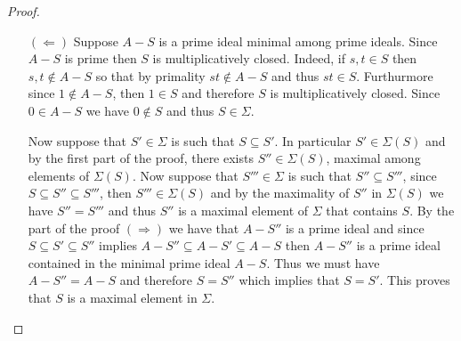 \begin{proof}
\begin{enumerate}
\begin{itemize}
	In order to prove \eqref{eq:not-in-S-nilradical}, first define the set $S_a\subseteq A$ as the product of the multiplicative sets $S$ and $\{1,a,a^2,\ldots\}$. Cleary $S_a$ is a multiplicative set. Since $1\in S$ by definition, we have that $a\in S_a$. Additionally, since $1\in\{1,a,a^2,\ldots\}$, then $S\subseteq S_a$. Therefore $a\not\in S$ if and only if $S\subsetneq S_a$. On the other hand, by definiton $a/1\in\mathrm{Nil}(S^{-1}A)$ if and only if $(a/1)^n=a^n/1=0/1$ for some $n>0$. This equality happens in $S^{-1}A$ if and only if there exists an $s\in S$ such that $a^ns=0$, but this is precisely the definition of $0$ being an element of $S_a$. With these considerations we have just reduced the problem of proving \eqref{eq:not-in-S-nilradical} to proving:
	\begin{equation}
		S\subsetneq S_a \quad\iff\quad 0\in S_a.
	\end{equation}
It is clear that the direction $(\Longleftarrow)$ follows from our hypothesis that $0\not\in S$. Suppose now that $0\not\in S_a$ so that, $S_a$ being multiplicative, $S_a\in\Sigma$. However this contradicts the maximality of $S$ because $S\subsetneq S_a$ and therefore we may conclude by contradiction that $0\in S_a$. This concludes the proof of \eqref{eq:not-in-S-nilradical}.

In conclusion, if $S$ is maximal, then $A-S$ is an ideal by \eqref{eq:not-in-S-nilradical}, it is a prime ideal because $S$ is multiplicatively closed and it is minimal among primes becuase $S$ is maximal.	
	
		\item[$(\Longleftarrow)$] Suppose $A-S$ is a prime ideal minimal among prime ideals. Since $A-S$ is prime then $S$ is multiplicatively closed. Indeed, if $s,t\in S$ then $s,t\not\in A-S$ so that by primality $st\not\in A-S$	and thus $st\in S$. Furthurmore since $1\not\in A-S$, then $1\in S$ and therefore $S$ is multiplicatively closed. Since $0\in A-S$ we have $0\not\in S$ and thus $S\in\Sigma$.
		
		Now suppose that $S'\in\Sigma$ is such that $S\subseteq S'$. In particular $S'\in\Sigma(S)$ and by the first part of the proof, there exists $S''\in\Sigma(S)$, maximal among elements of $\Sigma(S)$. Now suppose that $S'''\in\Sigma$ is such that $S''\subseteq S'''$, since $S\subseteq S''\subseteq S'''$, then $S'''\in\Sigma(S)$ and by the maximality of $S''$ in $\Sigma(S)$ we have $S''=S'''$ and thus $S''$ is a maximal element of $\Sigma$ that contains $S$. By the part of the proof $(\Longrightarrow)$ we have that $A-S''$ is a prime ideal and since $S\subseteq S'\subseteq S''$ implies $A-S''\subseteq A-S'\subseteq A-S$ then $A-S''$ is a prime ideal contained in the minimal prime ideal $A-S$. Thus we must have $A-S''=A-S$ and therefore $S=S''$ which implies that $S=S'$.  This proves that $S$ is a maximal element in $\Sigma$.
	\end{itemize}
\end{enumerate}

%
\end{proof}%

